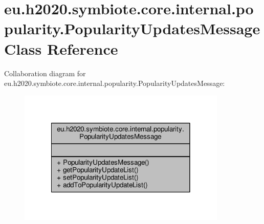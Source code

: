 \hypertarget{classeu_1_1h2020_1_1symbiote_1_1core_1_1internal_1_1popularity_1_1PopularityUpdatesMessage}{}\section{eu.\+h2020.\+symbiote.\+core.\+internal.\+popularity.\+Popularity\+Updates\+Message Class Reference}
\label{classeu_1_1h2020_1_1symbiote_1_1core_1_1internal_1_1popularity_1_1PopularityUpdatesMessage}


Collaboration diagram for eu.\+h2020.\+symbiote.\+core.\+internal.\+popularity.\+Popularity\+Updates\+Message\+:
\nopagebreak
\begin{figure}[H]
\begin{center}
\leavevmode
\includegraphics[width=282pt]{classeu_1_1h2020_1_1symbiote_1_1core_1_1internal_1_1popularity_1_1PopularityUpdatesMessage__coll__graph}
\end{center}
\end{figure}
